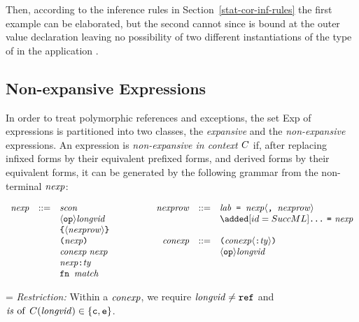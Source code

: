 Then, according to the
inference rules in Section~\ref{stat-cor-inf-rules}
the first example can be elaborated, but the second cannot since 
is bound at the outer value declaration leaving no possibility of two
different instantiations of the type of  in the application
.


\subsection{Non-expansive Expressions}
\label{expansive-sec}
In order to treat polymorphic references and exceptions,
the set Exp of expressions is partitioned into two classes, the {\sl
expansive} and the {\sl non-expansive} expressions.
An expression
     is {\sl non-expansive in context $C$} if, after replacing infixed forms
     by their equivalent prefixed forms, and derived forms by their equivalent
     forms, it can be generated  by the following grammar from the
     non-terminal ${\it nexp}$:
\medskip

\begin{displaymath}
  \begin{array}{rcl@{\hskip18mm}rcl}
    \nexp & ::= & \scon & \nexprow & ::= & \boxml{$\lab$ = $\nexp\langle$, $\nexprow\rangle$} \\
    & & \langle\OP\rangle\longvid & & & \ADD{\boxml{...}\ \boxml{=}\ \nexp} \\
    & & \ttlbrace\langle\nexprow\rangle\ttrbrace \\
    & &\boxml{($\nexp$)} & \conexp & ::= & \boxml{($\conexp\langle$:$\ty\rangle$)} \\
    & &\boxml{$\conexp\;\nexp$} & & & \hbox{$\langle\OP\rangle\longvid$} \\
    & &\nexp \boxml{:} \ty \\
    & &\boxml{fn $\match$}
  \end{array}%
\end{displaymath}%


\hangindent=\parindent{}\noindent
{\sl Restriction:}\/ Within a ${\it conexp}$, we require ${\it longvid}\neq\mbox{\tt ref}$ and
$\hbox{\it is}\, \mathbin{\rm of} \,C({\it longvid})\in\{\hbox{\tt c},\hbox{\tt e}\}$.\medskip

